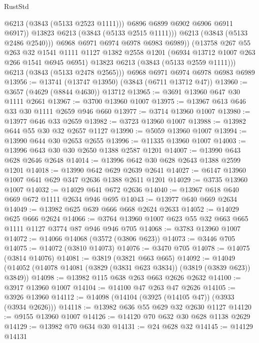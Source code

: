 \begin{lexlean}{RustStd}
\begin{coremodule}
                    @6213
                    (@3843 (@5133 @2523 @1111)))
                  @6896
                  @6899
                  @6902
                  @6906
                  @6911
                  @6917))
              @13823
              @6213
              (@3843 (@5133 @2515 @1111)))
            @6213
            (@3843 (@5133 @2486 @2540)))
          @6968
          @6971
          @6974
          @6978
          @6983
          @6989))
      (@13758
        @267
        @55
        @263
        @32
        @1541
        @1111
        @1127
        @1382
        @2558
        @1201
        (@6934 @13712 @1007 @263 @266 @1541 @6945 @6951)
        @13823
        @6213
        (@3843 (@5133 @2559 @1111)))
      @6213
      (@3843 (@5133 @2478 @2565)))
    @6968
    @6971
    @6974
    @6978
    @6983
    @6989
@13956 := @13741 (@13747 @13950) (@3843 (@6711 @13712 @47))
@13960 := @3657 (@4629 (@8844 @4630)) @13712
@13965 := @3691 @13960 @647 @30 @1111 @2661
@13967 := @3700 @13960 @1007
@13975 := @13967 @613 @646 @33 @30 @1111 @2659 @946 @660
@13977 := @3714 @13960 @1007
@13980 := @13977 @646 @33 @2659
@13982 := @3723 @13960 @1007
@13988 := @13982 @644 @55 @30 @32 @2657 @1127
@13990 := @5059 @13960 @1007
@13994 := @13990 @644 @30 @2653 @2655
@13996 := @11335 @13960 @1007
@14003 := @13996 @643 @30 @30 @2650 @1388 @2587 @1201
@14007 := @13990 @643 @628 @2646 @2648
@14014 := @13996 @642 @30 @628 @2643 @1388 @2599 @1201
@14018 := @13990 @642 @629 @2639 @2641
@14027 := @6147 @13960 @1007 @641 @629 @347 @2636 @1388 @2611 @1201
@14029 := @3735 @13960 @1007
@14032 := @14029 @641 @672 @2636
@14040 := @13967 @618 @640 @669 @672 @1111 @2634 @946 @695
@14043 := @13977 @640 @669 @2634
@14049 := @13982 @625 @639 @666 @668 @2624 @2633
@14052 := @14029 @625 @666 @2624
@14066 := @3764 @13960 @1007 @623 @55 @32 @663 @665 @1111 @1127 @3774 @87 @946 @946 @705
@14068 := @3783 @13960 @1007
@14072 := @14066 @14068 (@3572 (@3806 @623))
@14073 := @3446 @705
@14075 := @14072 (@3810 @14073)
@14076 := @3470 @705
@14078 := @14075 (@3814 @14076)
@14081 := @3819 (@3821 @663 @665)
@14092 := @14049 (@14052 (@14078 @14081 (@3829 (@3831 @623 @3834)) (@3819 (@3839 @623)) @3849))
@14098 := @13982 @115 @638 @263 @663 @2626 @2632
@14100 := @3917 @13960 @1007
@14104 := @14100 @47 @263 @47 @2626
@14105 := @3926 @13960
@14112 := @14098 (@14104 (@3925 (@14105 @47)) (@3933 (@3934 @2626)))
@14118 := @13982 @636 @55 @629 @32 @2630 @1127
@14120 := @9155 @13960 @1007
@14126 := @14120 @70 @632 @30 @628 @1138 @2629
@14129 := @13982 @70 @634 @30
@14131 := @24 @628 @32
@14145 := @14129
    @14131

\end{coremodule}
\end{lexlean}

